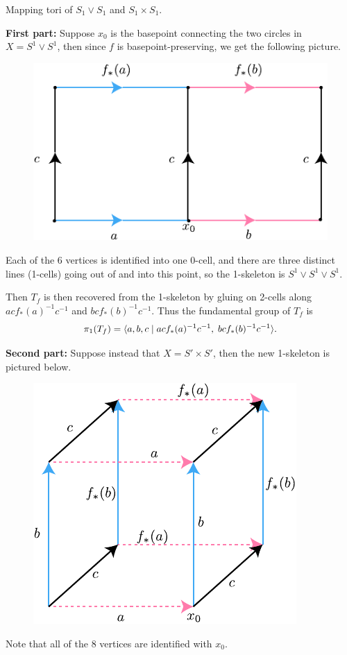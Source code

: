 \documentclass[twoside,10pt]{article}
\begin{document}
\newpage

\begin{exer}[1.2: 11]
	Mapping tori of $S_1 \vee S_1$ and $S_1 \times S_1$.
\end{exer}

\textbf{First part:} Suppose $x_0$ is the basepoint connecting the two circles in $X = S^{1}\vee S^{1}$, then since $f$ is basepoint-preserving, we get the following picture.

\begin{figure}[H]
	\centering
	\includegraphics[scale=1]{fig/11a.pdf}
\end{figure}

Each of the 6 vertices is identified into one 0-cell, and there are three distinct lines (1-cells) going out of and into this point, so the 1-skeleton is $S^{1}\vee S^{1}\vee S^{1}$.

Then $T_{f}$ is then recovered from the 1-skeleton by gluing on 2-cells along $acf_{*}(a)^{-1}c^{-1}$ and $bcf_{*}(b)^{-1}c^{-1}$. Thus the fundamental group of $T_{f}$ is
\[
	\pi_1(T_{f}) = \langle a,b,c \;|\; acf_{*}(a)^{-1}c^{-1},\; bcf_{*}(b)^{-1}c^{-1} \rangle.
\] 

\textbf{Second part:} Suppose instead that $X = S' \times S'$, then the new 1-skeleton is pictured below.

\begin{figure}[H]
	\centering
	\includegraphics[scale=1]{fig/11b.pdf}
\end{figure}
Note that all of the 8 vertices are identified with $x_0$.
\end{document}
